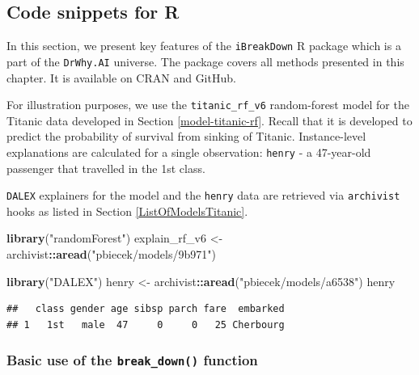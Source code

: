 \documentclass[12pt,]{krantz}
\newenvironment{Shaded}{\begin{snugshade}}{\end{snugshade}}
\newcommand{\KeywordTok}[1]{\textcolor[rgb]{0.13,0.29,0.53}{\textbf{#1}}}
\newcommand{\NormalTok}[1]{#1}
\newcommand{\OperatorTok}[1]{\textcolor[rgb]{0.81,0.36,0.00}{\textbf{#1}}}
\newcommand{\StringTok}[1]{\textcolor[rgb]{0.31,0.60,0.02}{#1}}
\begin{document}
\hypertarget{BDR}{%
\subsection{Code snippets for R}\label{BDR}}

In this section, we present key features of the \texttt{iBreakDown} R package \citep{iBreakDownRPackage} which is a part of the \texttt{DrWhy.AI} universe. The package covers all methods presented in this chapter. It is available on CRAN and GitHub.

For illustration purposes, we use the \texttt{titanic\_rf\_v6} random-forest model for the Titanic data developed in Section \ref{model-titanic-rf}. Recall that it is developed to predict the probability of survival from sinking of Titanic. Instance-level explanations are calculated for a single observation: \texttt{henry} - a 47-year-old passenger that travelled in the 1st class.

\texttt{DALEX} explainers for the model and the \texttt{henry} data are retrieved via \texttt{archivist} hooks as listed in Section \ref{ListOfModelsTitanic}.

\begin{Shaded}
\begin{Highlighting}[]
\KeywordTok{library}\NormalTok{(}\StringTok{"randomForest"}\NormalTok{)}
\NormalTok{explain_rf_v6 <-}\StringTok{ }\NormalTok{archivist}\OperatorTok{::}\KeywordTok{aread}\NormalTok{(}\StringTok{"pbiecek/models/9b971"}\NormalTok{)}

\KeywordTok{library}\NormalTok{(}\StringTok{"DALEX"}\NormalTok{)}
\NormalTok{henry <-}\StringTok{ }\NormalTok{archivist}\OperatorTok{::}\KeywordTok{aread}\NormalTok{(}\StringTok{"pbiecek/models/a6538"}\NormalTok{)}
\NormalTok{henry}
\end{Highlighting}
\end{Shaded}

\begin{verbatim}
##   class gender age sibsp parch fare  embarked
## 1   1st   male  47     0     0   25 Cherbourg
\end{verbatim}

\hypertarget{basic-use-of-the-break_down-function}{%
\subsubsection{\texorpdfstring{Basic use of the \texttt{break\_down()} function}{Basic use of the break\_down() function}}\label{basic-use-of-the-break_down-function}}
\end{document}
